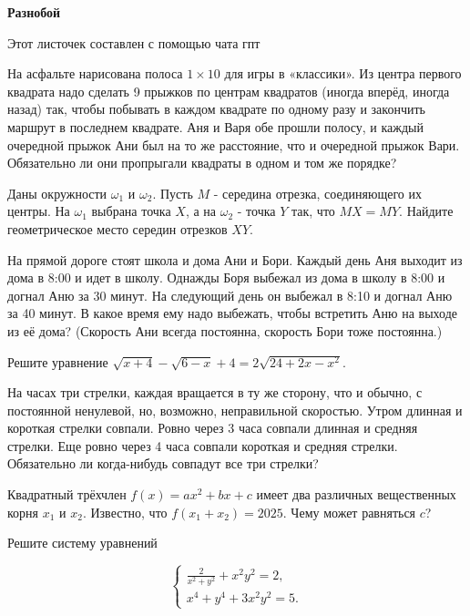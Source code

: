 \centerline{\bf \Huge Разнобой}

\begin{flushright}
        \scriptsize{Этот листочек составлен с помощью чата гпт}
\end{flushright}


На асфальте нарисована полоса $1 \times 10$ для игры в «классики». Из центра первого квадрата надо сделать 9 прыжков по центрам квадратов (иногда вперёд, иногда назад) так, чтобы побывать в каждом квадрате по одному разу и закончить маршрут в последнем квадрате. Аня и Варя обе прошли полосу, и каждый очередной прыжок Ани был на то же расстояние, что и очередной прыжок Вари. Обязательно ли они пропрыгали квадраты в одном и том же порядке?

Даны окружности $\omega_1$ и $\omega_2$. Пусть $M$ - середина отрезка, соединяющего их центры. На $\omega_1$ выбрана точка $X$, а на $\omega_2$ - точка $Y$ так, что $M X=M Y$. Найдите геометрическое место середин отрезков $X Y$.

На прямой дороге стоят школа и дома Ани и Бори. Каждый день Аня выходит из дома в 8:00 и идет в школу. Однажды Боря выбежал из дома в школу в 8:00 и догнал Аню за 30 минут. На следующий день он выбежал в 8:10 и догнал Аню за 40 минут. В какое время ему надо выбежать, чтобы встретить Аню на выходе из её дома? (Скорость Ани всегда постоянна, скорость Бори тоже постоянна.)

Решите уравнение $\sqrt{x+4}-\sqrt{6-x}+4=2 \sqrt{24+2 x-x^2}$.

На часах три стрелки, каждая вращается в ту же сторону, что и обычно, с постоянной ненулевой, но, возможно, неправильной скоростью. Утром длинная и короткая стрелки совпали. Ровно через 3 часа совпали длинная и средняя стрелки. Еще ровно через 4 часа совпали короткая и средняя стрелки. Обязательно ли когда-нибудь совпадут все три стрелки?

Квадратный трёхчлен $f(x)=a x^2+b x+c$ имеет два различных вещественных корня $x_1$ и $x_2$. Известно, что $f\left(x_1+x_2\right)=2025$. Чему может равняться $c$?

Решите систему уравнений

$$
\left\{\begin{array}{l}
\frac{2}{x^2+y^2}+x^2 y^2=2, \\
x^4+y^4+3 x^2 y^2=5 .
\end{array}\right.
$$